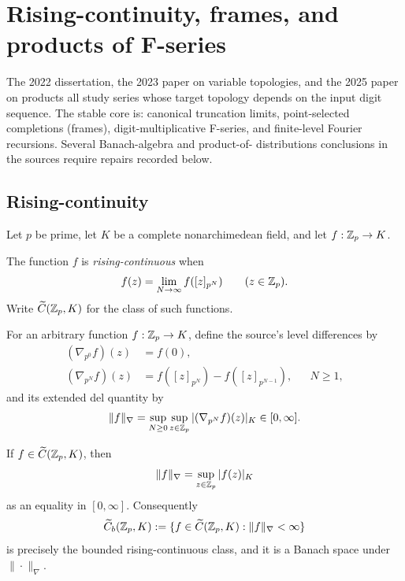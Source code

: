 \section{Rising-continuity, frames, and products of F-series}
\label{sec:rising-fseries}

The 2022 dissertation, the 2023 paper on variable topologies, and the 2025
paper on products all study series whose target topology depends on the input
digit sequence.  The stable core is: canonical truncation limits,
point-selected completions (frames), digit-multiplicative F-series, and
finite-level Fourier recursions.  Several Banach-algebra and product-of-
distributions conclusions in the sources require repairs recorded below.

\subsection{Rising-continuity}

Let $p$ be prime, let $K$ be a complete nonarchimedean field, and let
$f:\mathbb Z_p\to K$.

\begin{definition}
The function $f$ is \emph{rising-continuous} when
\begin{equation}
\label{eq:rising-continuity}
 f(z)=\lim_{N\to\infty}f([z]_{p^N})
 \qquad(z\in\mathbb Z_p).
\end{equation}
Write $\widetilde C(\mathbb Z_p,K)$ for the class of such functions.
\end{definition}

For an arbitrary function $f:\mathbb Z_p\to K$, define the source's level
differences by
\begin{align}
 (\nabla_{p^0}f)(z)&=f(0),\label{eq:del-zero}\\
 (\nabla_{p^N}f)(z)
 &=f([z]_{p^N})-f([z]_{p^{N-1}}),
 &&N\geq1,\label{eq:del-positive}
\end{align}
and its extended del quantity by
\begin{equation}
\label{eq:del-norm}
 \|f\|_{\nabla}
 =\sup_{N\geq0}\sup_{z\in\mathbb Z_p}|(\nabla_{p^N}f)(z)|_K
 \in[0,\infty].
\end{equation}

\begin{proposition}
\label{prop:del-norm-domain}
If $f\in\widetilde C(\mathbb Z_p,K)$, then
\begin{equation}
\label{eq:del-equals-sup}
 \|f\|_{\nabla}=\sup_{z\in\mathbb Z_p}|f(z)|_K
\end{equation}
as an equality in $[0,\infty]$.  Consequently
\[
 \widetilde C_b(\mathbb Z_p,K)
 :=\{f\in\widetilde C(\mathbb Z_p,K):\|f\|_\nabla<\infty\}
\]
is precisely the bounded rising-continuous class, and it is a Banach space
under $\|\cdot\|_\nabla$.
\end{proposition}

